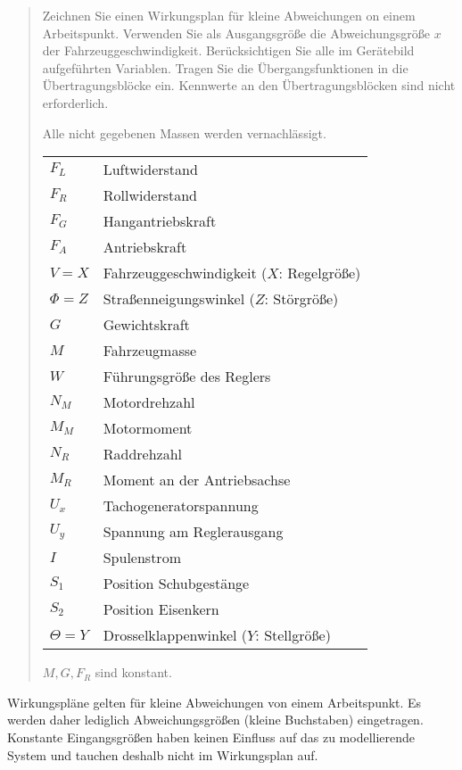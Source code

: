 \documentclass{exercise}
\begin{document}
\begin{quote}
		Zeichnen Sie einen Wirkungsplan für kleine Abweichungen on einem Arbeitspunkt.
		Verwenden Sie als Ausgangsgröße die Abweichungsgröße \(x\) der Fahrzeuggeschwindigkeit.
		Berücksichtigen Sie alle im Gerätebild aufgeführten Variablen.
		Tragen Sie die Übergangsfunktionen in die Übertragungsblöcke ein.
		Kennwerte an den Übertragungsblöcken sind nicht erforderlich.
		\begin{center}
		\end{center}
		Alle nicht gegebenen Massen werden vernachlässigt.
		\begin{center}
			\begin{tabular}{ll}
				\(F_L\) & Luftwiderstand\\
				\(F_R\) & Rollwiderstand\\
				\(F_G\) & Hangantriebskraft\\
				\(F_A\) & Antriebskraft\\
				\(V = X\) & Fahrzeuggeschwindigkeit (\(X\): Regelgröße)\\
				\(\Phi = Z\) & Straßenneigungswinkel (\(Z\): Störgröße)\\
				\(G\) & Gewichtskraft\\
				\(M\) & Fahrzeugmasse\\
				\(W\) & Führungsgröße des Reglers\\
				\(N_M\) & Motordrehzahl\\
				\(M_M\) & Motormoment\\
				\(N_R\) & Raddrehzahl\\
				\(M_R\) & Moment an der Antriebsachse\\
				\(U_x\) & Tachogeneratorspannung\\
				\(U_y\) & Spannung am Reglerausgang\\
				\(I\) & Spulenstrom\\
				\(S_1\) & Position Schubgestänge\\
				\(S_2\) & Position Eisenkern\\
				\(\Theta = Y\) & Drosselklappenwinkel (\(Y\): Stellgröße)
			\end{tabular}
		\end{center}
		\(M, G, F_R\) sind konstant.
	\end{quote}

	Wirkungspläne gelten für kleine Abweichungen von einem Arbeitspunkt.
	Es werden daher lediglich Abweichungsgrößen (kleine Buchstaben) eingetragen.
	Konstante Eingangsgrößen haben keinen Einfluss auf das zu modellierende System und tauchen deshalb nicht im Wirkungsplan auf.
\end{document}
